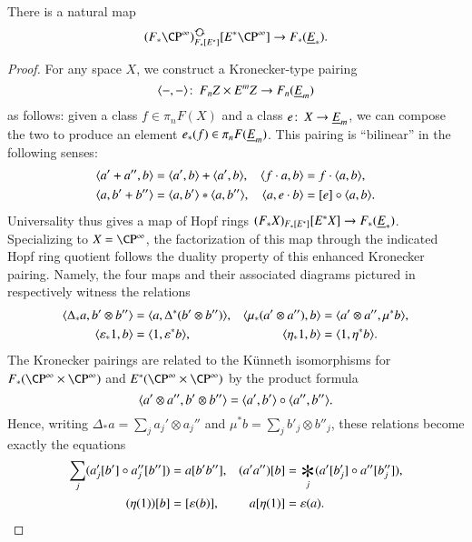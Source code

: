 \begin{lemma}\label{HopfRingComparisonMap}
There is a natural map \[(F_* \CP^\infty)_{F_*[E^*]}^{\circulatearrows}[E^* \CP^\infty] \to F_*(\OS{E}{*}).\]
\end{lemma}
\begin{proof}
For any space $X$, we construct a Kronecker-type pairing \[\langle-,-\rangle\colon\thinspace F_n Z \times E^m Z \to F_n(\underline{\smash{E}}_{m})\] as follows: given a class $f \in \pi_n F(X)$ and a class $e\colon\thinspace X \to \underline{\smash{E}}_{m}$, we can compose the two to produce an element $e_*(f) \in \pi_n F(\underline{\smash{E}}_{m})$.  This pairing is ``bilinear'' in the following senses:
\begin{align*}
\langle a' + a'', b\rangle & = \langle a', b\rangle + \langle a', b\rangle, &
\langle f \cdot a, b\rangle & = f \cdot \langle a, b\rangle, \\
\langle a, b' + b''\rangle & = \langle a, b'\rangle \ast \langle a, b''\rangle, &
\langle a, e \cdot b\rangle & = [e] \circ \langle a, b\rangle.
\end{align*}
Universality thus gives a map of Hopf rings $(F_* X)_{F_*[E^*]}[E^* X] \to F_*(\underline{\smash{E}}_{*})$.  Specializing to $X = \CP^\infty$, the factorization of this map through the indicated Hopf ring quotient follows the duality property of this enhanced Kronecker pairing.  Namely, the four maps and their associated diagrams pictured in  respectively witness the relations
\begin{align*}
\langle\Delta_* a, b' \otimes b''\rangle & = \langle a, \Delta^*(b' \otimes b'')\rangle, &
\langle\mu_*(a' \otimes a''), b\rangle & = \langle a' \otimes a'', \mu^* b\rangle, \\
\langle\varepsilon_* 1, b\rangle & = \langle1, \varepsilon^* b\rangle, &
\langle\eta_* 1, b\rangle & = \langle1, \eta^* b\rangle.
\end{align*}
The Kronecker pairings are related to the K\"unneth isomorphisms for $F_*(\CP^\infty \times \CP^\infty)$ and $E^*(\CP^\infty \times \CP^\infty)$ by the product formula \[\langle a' \otimes a'', b' \otimes b''\rangle = \langle a', b'\rangle \circ \langle a'', b''\rangle.\]  Hence, writing $\Delta_* a = \sum_j a_j' \otimes a_j''$ and $\mu^* b = \sum_j b'_j \otimes b''_j$, these relations become exactly the equations
\begin{align*}
\sum_j (a'_j[b'] \circ a''_j[b'']) & = a[b'b''], &
(a' a'')[b] & = \bigast_j (a'[b'_j] \circ a''[b''_j]), \\
(\eta(1))[b] & = [\eps(b)], &
a[\eta(1)] & = \eps(a).
\qedhere
\end{align*}
\end{proof}

